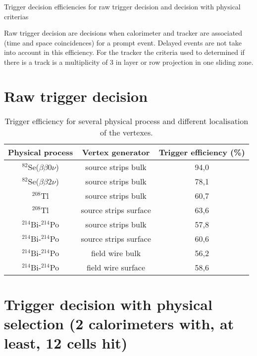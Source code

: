 \documentclass[12pt,a4paper]{article}
\newcommand{\BBZN}{$\beta\beta{}0\nu$}
\newcommand{\BBDN}{$\beta\beta{}2\nu$}
\newcommand{\SE}{$^{82}$Se}
\newcommand{\TL}{$^{208}$Tl}
\newcommand{\BIQ}{$^{214}$Bi}
\newcommand{\POQ}{$^{214}$Po}
\begin{document}
\begin{center}
 \Large{Trigger decision efficiencies for raw trigger decision and decision with physical criterias}
\end{center}

Raw trigger decision are decisions when calorimeter and tracker are associated (time and space coincidences) for a prompt event. Delayed events are not take into account in this efficiency.
For the tracker the criteria used to determined if there is a track is a multiplicity of 3 in layer or row projection in one sliding zone.

\section{Raw trigger decision}
\begin{table}[!h]
 \begin{center}
  \begin{tabular}{|c||c|c|}
    \hline
    Physical process   & Vertex generator      & Trigger efficiency (\%)  \\
    \hline
    \SE(\BBZN)         & source strips bulk    & 94,0 \\
    \SE(\BBDN)         & source strips bulk    & 78,1 \\
    \TL                & source strips bulk    & 60,7 \\
    \TL                & source strips surface & 63,6 \\
    \BIQ-\POQ          & source strips bulk    & 57,8 \\
    \BIQ-\POQ          & source strips surface & 60,6 \\
    \BIQ-\POQ          & field wire bulk       & 56,2 \\
    \BIQ-\POQ          & field wire surface    & 58,6 \\
    \hline
  \end{tabular}
  \end{center}
  \caption{Trigger efficiency for several physical process and different localisation of the vertexes.}
\label{efficacite_trigger}
\end{table}

\section{Trigger decision with physical selection (2 calorimeters with, at least, 12 cells hit)}
  
\end{document}
